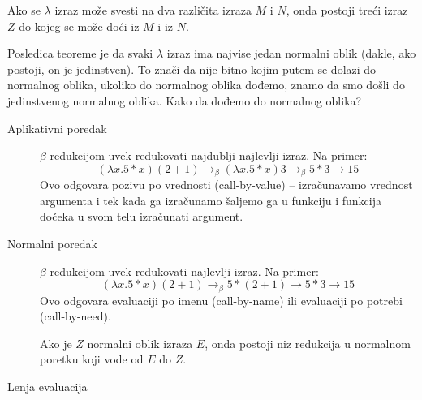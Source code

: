 \documentclass[../main.tex]{subfiles}
\begin{document}
\begin{theorem}
Ako se $\lambda$ izraz može svesti na dva različita izraza $M$ i $N$, onda postoji treći izraz $Z$ do kojeg se može doći iz $M$ i iz $N$.
\end{theorem}
Posledica teoreme je da svaki $\lambda$ izraz ima najvise jedan normalni oblik (dakle, ako postoji, on je jedinstven). To znači da nije bitno kojim putem se dolazi do normalnog oblika, ukoliko do normalnog oblika dođemo, znamo da smo došli do jedinstvenog normalnog oblika. Kako da dođemo do normalnog oblika?
\begin{description}
\item[Aplikativni poredak] \hfill

$\beta$ redukcijom uvek redukovati najdublji najlevlji izraz. Na primer: 
$$(\lambda x.5 * x)(2+1) \rightarrow_\beta (\lambda x.5 * x)3 \rightarrow_\beta 5 * 3 \rightarrow 15$$
Ovo odgovara pozivu po vrednosti (call-by-value) -- izračunavamo vrednost argumenta i tek kada ga izračunamo šaljemo ga u funkciju i funkcija dočeka u svom telu izračunati argument.

\item[Normalni poredak] \hfill

$\beta$ redukcijom uvek redukovati najlevlji izraz. Na primer:
$$ (\lambda x.5 * x)(2+1) \rightarrow_\beta 5 * (2 + 1) \rightarrow 5*3 \rightarrow 15 $$
Ovo odgovara evaluaciji po imenu (call-by-name) ili evaluaciji po potrebi (call-by-need).  

\begin{theorem}
Ako je $Z$ normalni oblik izraza $E$, onda postoji niz redukcija u normalnom poretku koji vode od $E$ do $Z$.	
\end{theorem}

\item[Lenja evaluacija] \hfill


\end{description}
\end{document}
